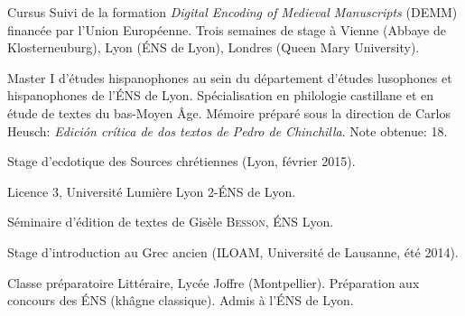 \begin{rubric}{Cursus}
                                \entry*
                            Suivi de la formation \textit{Digital Encoding of
                        Medieval Manuscripts} (DEMM) financée par l’Union
                        Européenne. Trois semaines de stage à Vienne (Abbaye de
                        Klosterneuburg), Lyon (ÉNS de Lyon), Londres (Queen Mary
                        University). 
                    
                                \entry*[2014-2015]
                            Master I d'études hispanophones au sein du
                        département d'études lusophones et hispanophones de
                        l'ÉNS de Lyon. Spécialisation en philologie castillane
                        et en étude de textes du bas-Moyen Âge. Mémoire préparé
                        sous la direction de Carlos Heusch: \textit{Edición
                        crítica de dos textos de Pedro de Chinchilla}.
                        Note obtenue: 18.
                    
                                \entry*
                            Stage d’ecdotique des Sources chrétiennes (Lyon,
                        février 2015).
                    
                                \entry*[2013-2014]
                            Licence 3, Université Lumière Lyon 2-ÉNS de Lyon. 
                    
                                \entry*
                            Séminaire d’édition de textes de Gisèle
                        \textsc{Besson}, ÉNS Lyon.
                    
                                \entry*
                            Stage d'introduction au Grec ancien (ILOAM,
                        Université de Lausanne, été 2014).
                    
                                \entry*[2011-2013]
                            Classe préparatoire Littéraire, Lycée Joffre
                        (Montpellier). Préparation aux concours des ÉNS (khâgne
                        classique). Admis à l'ÉNS de Lyon.
                    \end{rubric}





